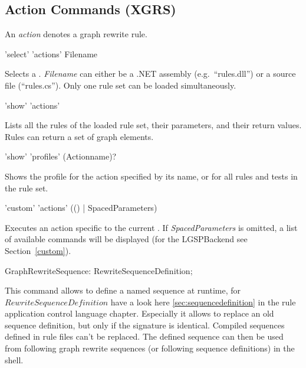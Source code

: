 \subsection{Action Commands (XGRS)}
\label{grsthings}
An \emph{action} denotes a graph rewrite rule.

\begin{rail}
  'select' 'actions' Filename
\end{rail}
Selects a .
\emph{Filename} can either be a .NET assembly (e.g.\ ``rules.dll'') or a source file (``rules.cs'').
Only one rule set can be loaded simultaneously.

\begin{rail}
  'show' 'actions'
\end{rail}
Lists all the rules of the loaded rule set, their parameters, and their return values.
Rules can return a set of graph elements.

\begin{rail}
  'show' 'profiles' (Actionname)?
\end{rail}
Shows the profile for the action specified by its name, or for all rules and tests in the rule set.

\begin{rail}
  'custom' 'actions' (() | SpacedParameters)
\end{rail}
Executes an action specific to the current .
If \emph{SpacedParameters} is omitted, a list of available commands will be displayed (for the LGSPBackend see Section~\ref{custom}).

\begin{rail}
  GraphRewriteSequence: RewriteSequenceDefinition;
\end{rail}
This command allows to define a named sequence at runtime, for $RewriteSequenceDefinition$ have a look here  \ref{sec:sequencedefinition} in the rule application control language chapter.
Especially it allows to replace an old sequence definition, but only if the signature is identical.
Compiled sequences defined in rule files can't be replaced.
The defined sequence can then be used from following graph rewrite sequences (or following sequence definitions) in the shell.

